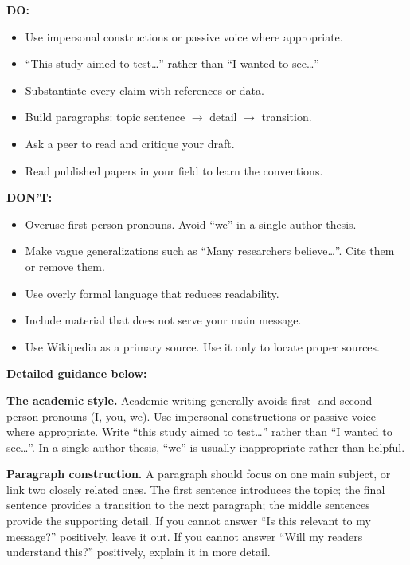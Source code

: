 \documentclass[12pt,a4paper,twocolumn]{article}
\begin{document}
\begin{stylenote}[title={Academic Writing Style Guide — Delete before submission}]

\textbf{DO:}
\begin{itemize}[leftmargin=*, nosep]
  \item Use impersonal constructions or passive voice where appropriate.
  \item ``This study aimed to test\ldots'' rather than ``I wanted to see\ldots''
  \item Substantiate every claim with references or data.
  \item Build paragraphs: topic sentence $\rightarrow$ detail $\rightarrow$ transition.
  \item Ask a peer to read and critique your draft.
  \item Read published papers in your field to learn the conventions.
\end{itemize}

\textbf{DON'T:}
\begin{itemize}[leftmargin=*, nosep]
  \item Overuse first-person pronouns. Avoid ``we'' in a single-author thesis.
  \item Make vague generalizations such as ``Many researchers believe\ldots''.
    Cite them or remove them.
  \item Use overly formal language that reduces readability.
  \item Include material that does not serve your main message.
  \item Use Wikipedia as a primary source. Use it only to locate proper sources.
\end{itemize}

\medskip
\textbf{Detailed guidance below:}

\textbf{The academic style.}
Academic writing generally avoids first- and second-person pronouns
(I, you, we). Use impersonal constructions or passive voice where appropriate.
Write ``this study aimed to test\ldots'' rather than ``I wanted to see\ldots''.
In a single-author thesis, ``we'' is usually inappropriate rather than helpful.

\textbf{Paragraph construction.}
A paragraph should focus on one main subject, or link two closely related ones.
The first sentence introduces the topic; the final sentence provides a transition
to the next paragraph; the middle sentences provide the supporting detail.
If you cannot answer ``Is this relevant to my message?'' positively, leave it out.
If you cannot answer ``Will my readers understand this?'' positively, explain it in more detail.


\end{stylenote}
\end{document}
